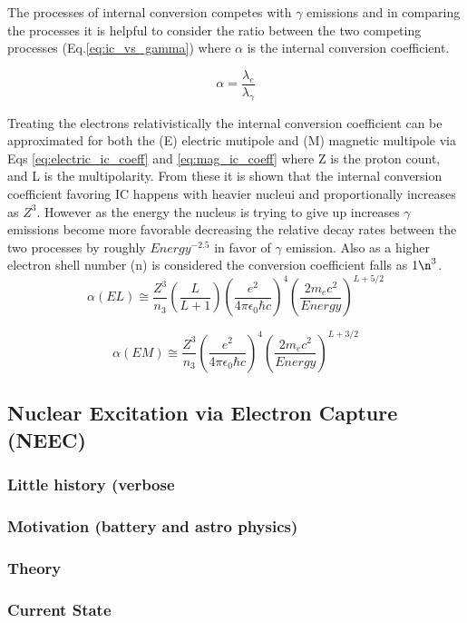 \documentclass[jon_ringuette_thesis.tex]{subfiles}
\begin{document}
    The processes of internal conversion competes with $\gamma$ emissions and in comparing the processes it is helpful to consider the ratio between the two competing processes (Eq.\ref{eq:ic_vs_gamma}) where $\alpha$ is the internal conversion coefficient.

    \begin{equation}
        \alpha = \frac{\lambda_e}{\lambda_{\gamma}}
        \label{eq:ic_vs_gamma}
    \end{equation}

    Treating the electrons relativistically the internal conversion coefficient can be approximated for both the (E) electric mutipole and (M) magnetic multipole via Eqs \ref{eq:electric_ic_coeff} and \ref{eq:mag_ic_coeff} where Z is the proton count, and L is the multipolarity.  From these it is shown that the internal conversion coefficient favoring IC happens with heavier nucleui and proportionally increases as $Z^3$.  However as the energy the nucleus is trying to give up increases $\gamma$ emissions become more favorable decreasing the relative decay rates between the two processes by roughly $Energy^{-2.5}$ in favor of $\gamma$ emission.  Also as a higher electron shell number (n) is considered the conversion coefficient falls as $1\n^3$. \cite{Krane1988} \cite{crasemann}
    \begin{equation}
        \alpha(EL) \cong \frac{Z^3}{n_3} \left(  \frac{L}{L + 1} \right) \left( \frac{e^2}{4\pi \epsilon_0 \hbar c} \right)^4 \left(\frac{2m_e c^2}{Energy} \right)^{L+5/2}
        \label{eq:electric_ic_coeff}
    \end{equation}

    \begin{equation}
        \alpha(EM) \cong \frac{Z^3}{n_3}  \left( \frac{e^2}{4\pi \epsilon_0 \hbar c} \right)^4 \left(\frac{2m_e c^2}{Energy} \right)^{L+3/2}
        \label{eq:mag_ic_coeff}
    \end{equation}

    \subsection{Nuclear Excitation via Electron Capture (NEEC)}

    \subsubsection{Little history (verbose}

    \subsubsection{Motivation (battery and astro physics)}

    \subsubsection{Theory}

    \subsubsection{Current State}
\end{document}
